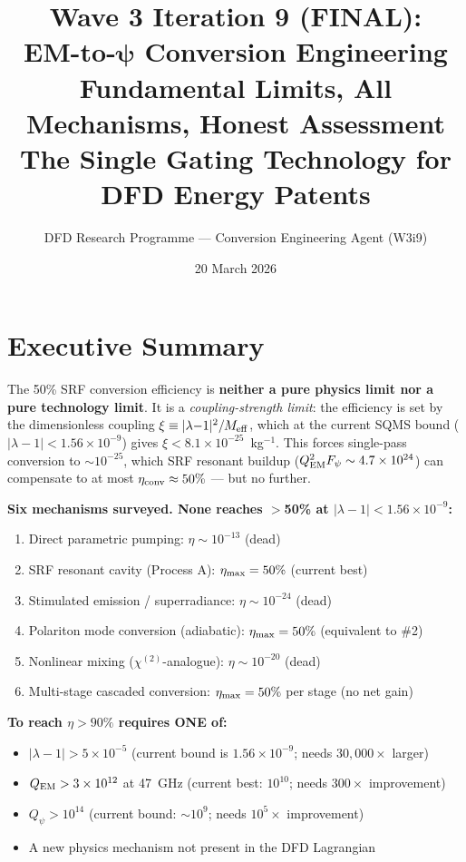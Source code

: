 \documentclass[11pt]{article}
\title{\textbf{Wave 3 Iteration 9 (FINAL):}\\
\textbf{EM-to-$\boldsymbol{\psi}$ Conversion Engineering}\\[12pt]
{\large Fundamental Limits, All Mechanisms, Honest Assessment}\\[4pt]
{\large The Single Gating Technology for DFD Energy Patents}}
\author{DFD Research Programme --- Conversion Engineering Agent (W3i9)}
\date{20 March 2026}
\newcommand{\ee}[1]{\times 10^{#1}}
\newcommand{\Meff}{M_{\rm eff}}
\newcommand{\lambdaone}{|\lambda{-}1|}
\newcommand{\Qpsi}{Q_\psi}
\newcommand{\QEM}{Q_{\rm EM}}
\newcommand{\Fpsi}{F_\psi}
\begin{document}
\maketitle
\tableofcontents
\newpage

\section*{Executive Summary}

\begin{tcolorbox}[colback=red!5!white, colframe=red!60!black,
  title=\textbf{W3i9 FINAL VERDICT: READ THIS FIRST}]

The 50\% SRF conversion efficiency is \textbf{neither a pure physics
limit nor a pure technology limit}. It is a \emph{coupling-strength
limit}: the efficiency is set by the dimensionless coupling
$\xi \equiv \lambdaone^2/\Meff$, which at the current SQMS bound
($\lambdaone < 1.56\ee{-9}$) gives $\xi < 8.1\ee{-25}$~kg$^{-1}$.
This forces single-pass conversion to $\sim 10^{-25}$, which SRF
resonant buildup ($Q_{\rm EM}^2 \Fpsi \sim 4.7\ee{24}$) can
compensate to at most $\eta_{\rm conv} \approx 50\%$ --- but no further.

\medskip
\textbf{Six mechanisms surveyed. None reaches $>$50\% at $\lambdaone <
1.56\ee{-9}$:}
\begin{enumerate}[nosep]
\item Direct parametric pumping: $\eta \sim 10^{-13}$ (dead)
\item SRF resonant cavity (Process A): $\eta_{\rm max} = 50\%$ (current best)
\item Stimulated emission / superradiance: $\eta \sim 10^{-24}$ (dead)
\item Polariton mode conversion (adiabatic): $\eta_{\rm max} = 50\%$ (equivalent to \#2)
\item Nonlinear mixing ($\chi^{(2)}$-analogue): $\eta \sim 10^{-20}$ (dead)
\item Multi-stage cascaded conversion: $\eta_{\rm max} = 50\%$ per stage (no net gain)
\end{enumerate}

\medskip
\textbf{To reach $\eta > 90\%$ requires ONE of:}
\begin{itemize}[nosep]
\item $\lambdaone > 5\ee{-5}$ (current bound is $1.56\ee{-9}$; needs $30{,}000\times$ larger)
\item $\QEM > 3\ee{12}$ at 47~GHz (current best: $10^{10}$; needs $300\times$ improvement)
\item $\Qpsi > 10^{14}$ (current bound: $\sim 10^9$; needs $10^5\times$ improvement)
\item A new physics mechanism not present in the DFD Lagrangian
\end{itemize}


\end{tcolorbox}
\end{document}
